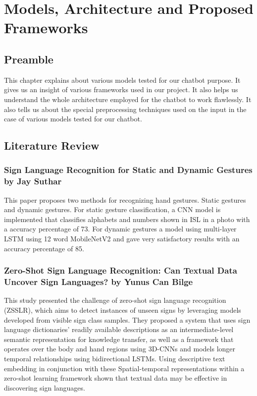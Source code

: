 \documentclass[12pt,a4paper]{report}
\begin{document}
\chapter{Models, Architecture and Proposed Frameworks}

\section{Preamble}
This chapter explains about various models tested for our chatbot purpose. It gives us an insight of various frameworks used in our project. It also helps us understand the whole architecture employed for the chatbot to work flawlessly. It also tells us about the special preprocessing techniques used on the input in the case of various models tested for our chatbot.

\section{Literature Review}

\subsection{Sign Language Recognition for Static and Dynamic Gestures by Jay Suthar\cite{b1}}
This paper proposes two methods for recognizing hand gestures. Static gestures and dynamic gestures. For static gesture classification, a CNN model is implemented that classifies alphabets and numbers shown in ISL in a photo with a accuracy percentage of 73. For dynamic gestures a model using multi-layer LSTM using 12 word MobileNetV2 and gave very satisfactory results with an accuracy percentage of 85.

\subsection{Zero-Shot Sign Language Recognition: Can Textual Data Uncover Sign Languages? by Yunus Can Bilge\cite{b2}}
This study presented the challenge of zero-shot sign language recognition (ZSSLR), which aims to detect instances of unseen signs by leveraging models developed from visible sign class samples. They proposed a system that uses sign language dictionaries' readily available descriptions as an intermediate-level semantic representation for knowledge transfer, as well as a framework that operates over the body and hand regions using 3D-CNNs and models longer temporal relationships using bidirectional LSTMs. Using descriptive text embedding in conjunction with these Spatial-temporal representations within a zero-shot learning framework shown that textual data may be effective in discovering sign languages.
\end{document}
